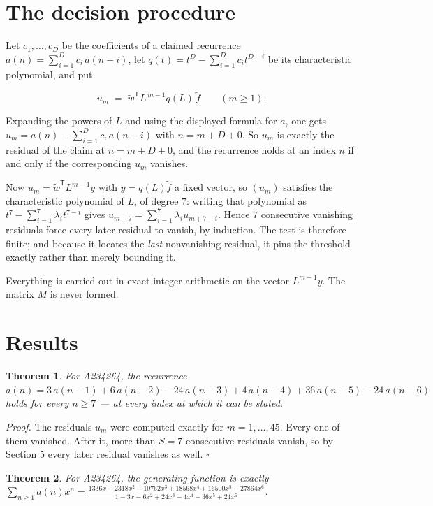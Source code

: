 \documentclass[11pt]{article}
\newtheorem{theorem}{Theorem}
\theoremstyle{definition}
\begin{document}
\section{The decision procedure}

Let $c_1,\dots,c_D$ be the coefficients of a claimed recurrence $a(n) = \sum_{i=1}^{D} c_i\,a(n-i)$, let $q(t) = t^{D} - \sum_{i=1}^{D} c_i t^{D-i}$ be its characteristic polynomial, and put

\[u_m \;=\; \tilde w^{\mathsf T} L^{\,m-1} q(L)\,\tilde f \qquad (m \ge 1).\]

Expanding the powers of $L$ and using the displayed formula for $a$, one gets $u_m = a(n) - \sum_{i=1}^{D} c_i\,a(n-i)$ with $n = m + D + 0$. So $u_m$ is exactly the residual of the claim at $n = m + D + 0$, and the recurrence holds at an index $n$ if and only if the corresponding $u_m$ vanishes.

Now $u_m = \tilde w^{\mathsf T} L^{m-1} y$ with $y = q(L)\tilde f$ a fixed vector, so $(u_m)$ satisfies the characteristic polynomial of $L$, of degree $7$: writing that polynomial as $t^{7} - \sum_{i=1}^{7} \lambda_i t^{7-i}$ gives $u_{m+7} = \sum_{i=1}^{7} \lambda_i u_{m+7-i}$. Hence $7$ consecutive vanishing residuals force every later residual to vanish, by induction. The test is therefore finite; and because it locates the {\itshape last} nonvanishing residual, it pins the threshold exactly rather than merely bounding it.

Everything is carried out in exact integer arithmetic on the vector $L^{m-1}y$. The matrix $M$ is never formed.

\section{Results}

\begin{theorem} For A234264, the recurrence $a(n) = 3\,a(n-1) + 6\,a(n-2) - 24\,a(n-3) + 4\,a(n-4) + 36\,a(n-5) - 24\,a(n-6)$ holds for every $n \ge 7$ --- at every index at which it can be stated.\end{theorem}

{\itshape Proof.} The residuals $u_m$ were computed exactly for $m = 1,\dots,45$. Every one of them vanished. After it, more than $S = 7$ consecutive residuals vanish, so by Section 5 every later residual vanishes as well. $\square$

\begin{theorem} For A234264, the generating function is exactly $\sum_{n\ge 1} a(n)x^n = \frac{1336x - 2318x^{2} - 10762x^{3} + 18568x^{4} + 16500x^{5} - 27864x^{6}}{1 - 3x - 6x^{2} + 24x^{3} - 4x^{4} - 36x^{5} + 24x^{6}}$.\end{theorem}
\end{document}
